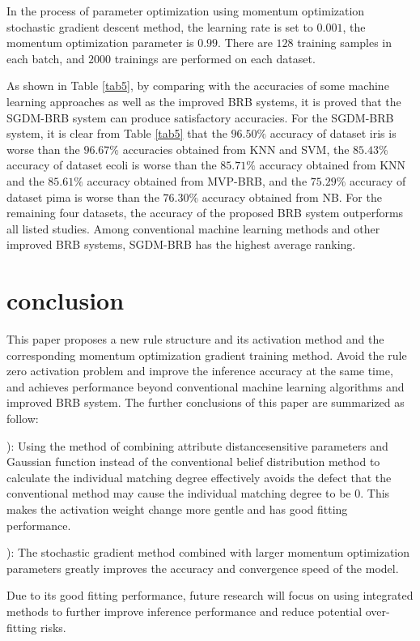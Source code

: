 \documentclass{ieeeaccess}
\begin{document}
In the process of parameter optimization using momentum optimization stochastic gradient descent method,
the learning rate is set to $0.001$, the momentum optimization parameter is $0.99$.
There are $128$ training samples in each batch, and $2000$ trainings are performed on each dataset.

As shown in Table \ref{tab5}, by comparing with the accuracies of some machine learning approaches as well as the improved BRB systems, it is proved that the SGDM-BRB system can produce satisfactory accuracies.
For the SGDM-BRB system, it is clear from Table \ref{tab5} that
the $96.50\%$ accuracy of dataset iris is worse than the $96.67\%$ accuracies obtained from KNN and SVM,
the $85.43\%$ accuracy of dataset ecoli is worse than the $85.71\%$ accuracy obtained from KNN and the $85.61\%$ accuracy obtained from MVP-BRB,
and the $75.29\%$ accuracy of dataset pima is worse than the $76.30\%$ accuracy obtained from NB.
For the remaining four datasets, the accuracy of the proposed BRB system outperforms all listed studies.
Among conventional machine learning methods and other improved BRB systems, SGDM-BRB has the highest average ranking.

\section{conclusion}
This paper proposes a new rule structure and its activation method and the corresponding momentum optimization gradient training method.
Avoid the rule zero activation problem and improve the inference accuracy at the same time,
and achieves performance beyond conventional machine learning algorithms and improved BRB system.
The further conclusions of this paper are summarized as follow:

): Using the method of combining attribute distancesensitive parameters and Gaussian function instead of
the conventional belief distribution method to calculate the individual matching degree effectively avoids the defect that
the conventional method may cause the individual matching degree to be 0.
This makes the activation weight change more gentle and has good fitting performance.

): The stochastic gradient method combined with larger momentum optimization parameters greatly improves the accuracy and convergence speed of the model.

Due to its good fitting performance, future research will focus on using integrated methods to further improve inference performance and reduce potential over-fitting risks.
\end{document}
